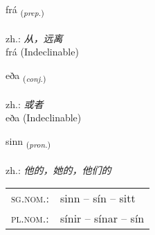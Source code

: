 \documentclass[frontgrid, backgrid]{flacards}\usepackage[]{graphicx}\usepackage[]{xcolor}
\begin{document}
{frá \small{\textsubscript{(\textit{prep.})}} \\[1ex]
\textphonetic{[frauː]} \\
zh.: \emph{从，远离} \\  [2ex]
frá (Indeclinable)}


\renewcommand{\flhead}{\vskip5pt \fboxsep=0pt {\small\bfseries\footnotesize Samtenging | 连词}}
\renewcommand{\fcfoot}{\vskip5pt \fboxsep=0pt \hspace{2pt}{\small\bfseries\footnotesize 1K}}

\renewcommand{\blhead}{\vskip5pt {\small\bfseries\footnotesize Samtenging | 连词 }}
\renewcommand{\bcfoot}{\vskip5pt \hspace{2pt}{\small\bfseries\footnotesize 1K}}


{eða \small{\textsubscript{(\textit{conj.})}} \\[1ex]
\textphonetic{[ɛːða]} \\
zh.: \emph{或者} \\  [2ex]
eða (Indeclinable)}

\renewcommand{\flhead}{\vskip5pt \fboxsep=0pt {\small\bfseries\footnotesize Fornafn | 代词}}
\renewcommand{\fcfoot}{\vskip5pt \fboxsep=0pt \hspace{2pt}{\small\bfseries\footnotesize 1K}}

\renewcommand{\blhead}{\vskip5pt {\small\bfseries\footnotesize Fornafn | 代词 }}
\renewcommand{\bcfoot}{\vskip5pt \hspace{2pt}{\small\bfseries\footnotesize 1K}}


{sinn \small{\textsubscript{(\textit{pron.})}} \\[1ex] %
\textphonetic{[sɪn]} \\
zh.: \emph{他的，她的，他们的} \\  [2ex]
\renewcommand*{\arraystretch}{0.8}
\begin{tabular}{ll}
\textsc{sg.nom.}: & sinn  --  sín -- sitt \\ 
\textsc{pl.nom.}: & sínir -- sínar -- sín
\end{tabular}
}
\end{document}
